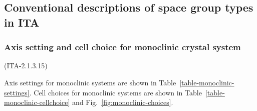 
\subsection{Conventional descriptions of space group types in ITA}

\subsubsection{Axis setting and cell choice for monoclinic crystal system}

(ITA-2.1.3.15)


Axis settings for monoclinic systems are shown in Table~\ref{table-monoclinic-settings}.
Cell choices for monoclinic systems are shown in Table~\ref{table-monoclinic-cellchoice} and Fig.~\ref{fig:monoclinic-choices}.

